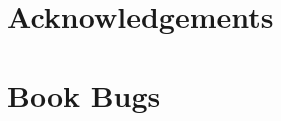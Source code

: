 \documentclass[a5paper,oneside]{scrbook}
\begin{document}
	


\begin{comment}
\tableofcontents

\chapter*{Preface\label{preface}}


\chapter{One Blinkenlight\label{ch1}}


\chapter{Speedy Blinkenlight\label{ch2}}


\chapter{Two Blinkenlights\label{ch3}}


\chapter*{Waiting for the World\label{medio1}}


\chapter{Push the Button\label{ch4}}


\chapter{Tick... tick... tick...\label{ch5a}}


\chapter{Undressing Toggle\label{ch5}}


\chapter{Reusing Code, Multiple Buttons\label{ch6}}


\end{comment}

\chapter{Acknowledgements\label{acknowledgements}}


\chapter{Book Bugs\label{bugs}}

\end{document}
